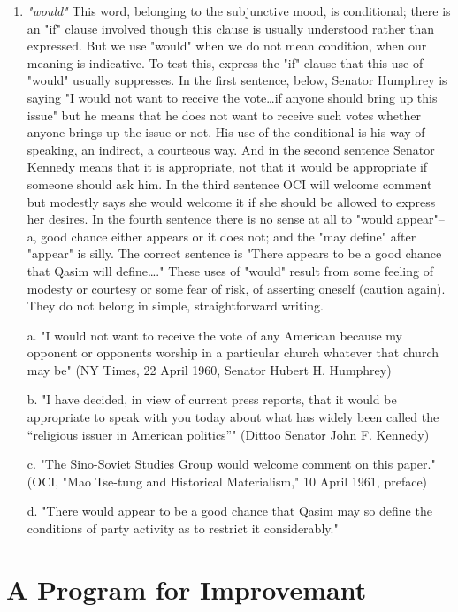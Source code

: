 \documentclass[
    oneside,
    11pt,
    draft
]{memoir}
\begin{document}
\begin{enumerate}
  \item \emph{"would"} This word, belonging to the subjunctive mood, is conditional; there is an "if" clause involved though this clause is usually understood rather than expressed. But we use "would" when we do not mean condition, when our meaning is indicative. To test this, express the "if" clause that this use of "would" usually suppresses. In the first sentence, below, Senator Humphrey is saying "I would not want to receive the vote\dots if anyone should bring up this issue" but he means that he does not want to receive such votes whether anyone brings up the issue or not. His use of the conditional is his way of speaking, an indirect, a courteous way. And in the second sentence Senator Kennedy means that it is appropriate, not that it would be appropriate if someone should ask him. In the third sentence OCI will welcome comment but modestly says she would welcome it if she should be allowed to express her desires. In the fourth sentence there is no sense at all to "would appear"-- a, good chance either appears or it does not; and the "may define" after "appear" is silly. The correct sentence is "There appears to be a good chance that Qasim will define\dots." These uses of "would" result from some feeling of modesty or courtesy or some fear of risk, of asserting oneself (caution again). They do not belong in simple, straightforward writing. 
  
  a. "I would not want to receive the vote of any American because my opponent or opponents worship in a particular church whatever that church may be" (NY Times, 22 April 1960, Senator Hubert H. Humphrey) 
  
  b. "I have decided, in view of current press reports, that it would be appropriate to speak with you today about what has widely been called the \enquote{religious issuer in American politics}" (Dittoo Senator John F. Kennedy) 
  
  c. "The Sino-Soviet Studies Group would welcome comment on this paper." (OCI, "Mao Tse-tung and Historical Materialism," 10 April 1961, preface) 
  
  d. "There would appear to be a good chance that Qasim may so define the conditions of party activity as to restrict it considerably."
\end{enumerate}
  
\chapter{A Program for Improvemant}
\end{document}
